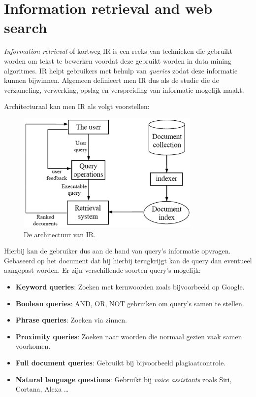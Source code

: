 \chapter{Information retrieval and web search}
\emph{Information retrieval} of kortweg IR is een reeks van technieken die gebruikt worden om tekst te bewerken voordat deze gebruikt worden in data mining algoritmes. IR helpt gebruikers met behulp van \emph{queries} zodat deze informatie kunnen bijwinnen. Algemeen definieert men IR dus als de studie die de verzameling, verwerking, opslag en verspreiding van informatie mogelijk maakt.

Architecturaal kan men IR als volgt voorstellen:
\begin{figure}
\includegraphics[width=0.8\textwidth]{res/IR}
\caption{De architectuur van IR.}
\end{figure}

Hierbij kan de gebruiker dus aan de hand van query's informatie opvragen. Gebaseerd op het document dat hij hierbij terugkrijgt kan de query dan eventueel aangepast worden. Er zijn verschillende soorten query's mogelijk:
\begin{itemize}
\item \textbf{Keyword queries}: Zoeken met kernwoorden zoals bijvoorbeeld op Google.
\item \textbf{Boolean queries}: AND, OR, NOT gebruiken om query's samen te stellen.
\item \textbf{Phrase queries}: Zoeken via zinnen.
\item \textbf{Proximity queries}: Zoeken naar woorden die normaal gezien vaak samen voorkomen.
\item \textbf{Full document queries}: Gebruikt bij bijvoorbeeld plagiaatcontrole.
\item \textbf{Natural language questions}: Gebruikt bij \emph{voice assistants} zoals Siri, Cortana, Alexa \dots
\end{itemize}

